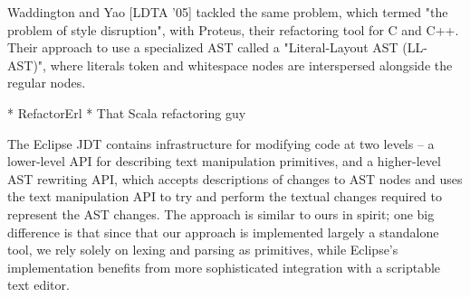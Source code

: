 Waddington and Yao [LDTA '05] tackled the same problem, which termed "the
problem of style disruption", with Proteus, their refactoring tool for C and
C++. Their approach to use a specialized AST called a "Literal-Layout AST
(LL-AST)", where literals token and whitespace nodes are interspersed alongside
the regular nodes.

* RefactorErl * That Scala refactoring guy


The Eclipse JDT contains infrastructure for modifying code at two levels -- a
lower-level API for describing text manipulation primitives, and a higher-level
AST rewriting API, which accepts descriptions of changes to AST nodes and uses
the text manipulation API to try and perform the textual changes required to
represent the AST changes. The approach is similar to ours in spirit; one big
difference is that since that our approach is implemented largely a standalone
tool, we rely solely on lexing and parsing as primitives, while Eclipse's
implementation benefits from more sophisticated integration with a scriptable
text editor.
